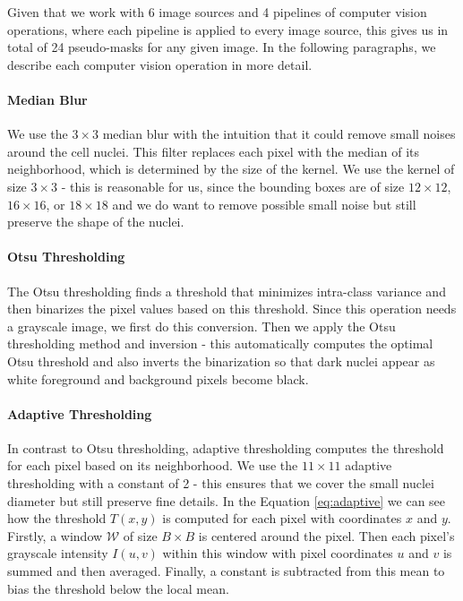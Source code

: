 Given that we work with 6 image sources and 4 pipelines of computer vision operations, where each pipeline is applied to every image source, this gives us in total of 24 pseudo-masks for any given image. In the following paragraphs, we describe each computer vision operation in more detail.

\paragraph{Median Blur}
We use the $3\!\times\!3$ median blur with the intuition that it could remove small noises around the cell nuclei. This filter replaces each pixel with the median of its neighborhood, which is determined by the size of the kernel. We use the kernel of size $3\!\times\!3$ - this is reasonable for us, since the bounding boxes are of size $12\!\times\!12$, $16\!\times\!16$, or $18\!\times\!18$ and we do want to remove possible small noise but still preserve the shape of the nuclei.

\paragraph{Otsu Thresholding}
The Otsu thresholding finds a threshold that minimizes intra-class variance and then binarizes the pixel values based on this threshold. Since this operation needs a grayscale image, we first do this conversion. Then we apply the Otsu thresholding method and inversion - this automatically computes the optimal Otsu threshold and also inverts the binarization so that dark nuclei appear as white foreground and background pixels become black.

\paragraph{Adaptive Thresholding}
In contrast to Otsu thresholding, adaptive thresholding computes the threshold for each pixel based on its neighborhood. We use the $11\!\times\!11$ adaptive thresholding with a constant of 2 - this ensures that we cover the small nuclei diameter but still preserve fine details. In the Equation \ref{eq:adaptive} we can see how the threshold $T(x,y)$ is computed for each pixel with coordinates $x$ and $y$. Firstly, a window $\mathcal{W}$ of size $B\!\times\! B$ is centered around the pixel. Then each pixel's grayscale intensity $I(u,v)$ within this window with pixel coordinates $u$ and $v$ is summed and then averaged. Finally, a constant is subtracted from this mean to bias the threshold below the local mean.

